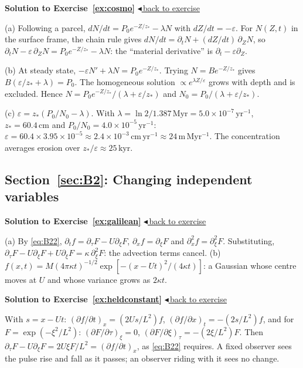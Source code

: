 \documentclass[11pt,letterpaper]{article}
\numberwithin{equation}{section}
\newcommand{\units}[1]{\,\mathrm{#1}}
\newenvironment{solution}[1]{%
  \par\addvspace{1.0ex}\noindent\phantomsection\label{sol:#1}%
  {\color{exorange!85!black}\bfseries Solution to Exercise~\ref{ex:#1}}%
  \hfill\hyperref[ex:#1]{\small$\blacktriangleleft$\,back to exercise}\par\nopagebreak\smallskip}%
  {\par\smallskip\noindent{\color{exorange!40}\rule{\linewidth}{0.4pt}}\par}
\begin{document}
\begin{solution}{cosmo}
(a) Following a parcel, $dN/dt=P_0e^{-Z/z_*}-\lambda N$ with $dZ/dt=-\varepsilon$. For $N(Z,t)$ in the surface frame, the chain rule gives
$dN/dt=\partial_tN+(dZ/dt)\,\partial_Z N$, so
$\partial_tN-\varepsilon\,\partial_Z N=P_0e^{-Z/z_*}-\lambda N$: the ``material derivative'' is $\partial_t-\varepsilon\partial_Z$.

(b) At steady state, $-\varepsilon N'+\lambda N=P_0e^{-Z/z_*}$. Trying $N=Be^{-Z/z_*}$ gives $B(\varepsilon/z_*+\lambda)=P_0$. The homogeneous
solution $\propto e^{\lambda Z/\varepsilon}$ grows with depth and is excluded. Hence $N=P_0e^{-Z/z_*}/(\lambda+\varepsilon/z_*)$ and
$N_0=P_0/(\lambda+\varepsilon/z_*)$.

(c) $\varepsilon=z_*(P_0/N_0-\lambda)$. With $\lambda=\ln2/1.387\units{Myr}=5.0\times10^{-7}\units{yr^{-1}}$, $z_*=60.4\units{cm}$ and
$P_0/N_0=4.0\times10^{-5}\units{yr^{-1}}$: $\varepsilon=60.4\times3.95\times10^{-5}\approx2.4\times10^{-3}\units{cm\,yr^{-1}}\approx24\units{m\,Myr^{-1}}$.
The concentration averages erosion over $z_*/\varepsilon\approx25\units{kyr}$.
\end{solution}

\subsection*{Section~\ref{sec:B2}: Changing independent variables}

\begin{solution}{galilean}
(a) By \eqref{eq:B22}, $\partial_tf=\partial_\tau F-U\partial_\xi F$, $\partial_xf=\partial_\xi F$ and $\partial_x^2f=\partial_\xi^2F$. Substituting,
$\partial_\tau F-U\partial_\xi F+U\partial_\xi F=\kappa\,\partial_\xi^2F$: the advection terms cancel.
(b) $f(x,t)=M(4\pi\kappa t)^{-1/2}\exp[-(x-Ut)^2/(4\kappa t)]$: a Gaussian whose centre moves at $U$ and whose variance grows as $2\kappa t$.
\end{solution}

\begin{solution}{heldconstant}
With $s=x-Ut$: $(\partial f/\partial t)_x=(2Us/L^2)f$, $(\partial f/\partial x)_t=-(2s/L^2)f$, and for $F=\exp(-\xi^2/L^2)$:
$(\partial F/\partial\tau)_\xi=0$, $(\partial F/\partial\xi)_\tau=-(2\xi/L^2)F$. Then $\partial_\tau F-U\partial_\xi F=2U\xi F/L^2=(\partial f/\partial t)_x$, as \eqref{eq:B22} requires.
A fixed observer sees the pulse rise and fall as it passes; an observer riding with it sees no change.
\end{solution}
\end{document}
